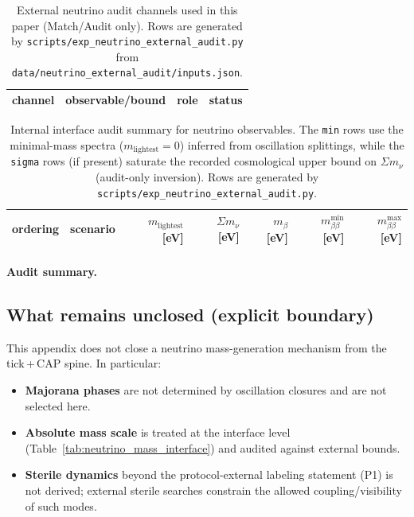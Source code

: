 \begin{table}[t]
\centering
\small
\setlength{\tabcolsep}{6pt}
\renewcommand{\arraystretch}{1.15}
\begin{tabular}{llll}
\toprule
channel & observable/bound & role & status \\
\midrule
%
\end{tabular}
\caption{External neutrino audit channels used in this paper (Match/Audit only). Rows are generated by \texttt{scripts/exp\_neutrino\_external\_audit.py} from \texttt{data/neutrino\_external\_audit/inputs.json}.}
\label{tab:neutrino_external_audit_ledger}
\end{table}

\begin{table}[t]
\centering
\small
\setlength{\tabcolsep}{6pt}
\renewcommand{\arraystretch}{1.15}
\begin{tabular}{llrrrrr}
\toprule
ordering & scenario & $m_{\mathrm{lightest}}$ [eV] & $\Sigma m_\nu$ [eV] & $m_\beta$ [eV] & $m_{\beta\beta}^{\min}$ [eV] & $m_{\beta\beta}^{\max}$ [eV] \\
\midrule
%
\end{tabular}
\caption{Internal interface audit summary for neutrino observables. The \texttt{min} rows use the minimal-mass spectra ($m_{\mathrm{lightest}}=0$) inferred from oscillation splittings, while the \texttt{sigma} rows (if present) saturate the recorded cosmological upper bound on $\Sigma m_\nu$ (audit-only inversion). Rows are generated by \texttt{scripts/exp\_neutrino\_external\_audit.py}.}
\label{tab:neutrino_external_audit_internal}
\end{table}

\paragraph{Audit summary.}
\AuditTag %

\subsection{What remains unclosed (explicit boundary)}
\label{subsec:neutrino_external_audit_boundary}

This appendix does not close a neutrino mass-generation mechanism from the tick\,+\,CAP spine.
In particular:
\begin{itemize}
\item \textbf{Majorana phases} are not determined by oscillation closures and are not selected here.
\item \textbf{Absolute mass scale} is treated at the interface level (Table~\ref{tab:neutrino_mass_interface}) and audited against external bounds.
\item \textbf{Sterile dynamics} beyond the protocol-external labeling statement (P1) is not derived; external sterile searches constrain the allowed coupling/visibility of such modes.
\end{itemize}

